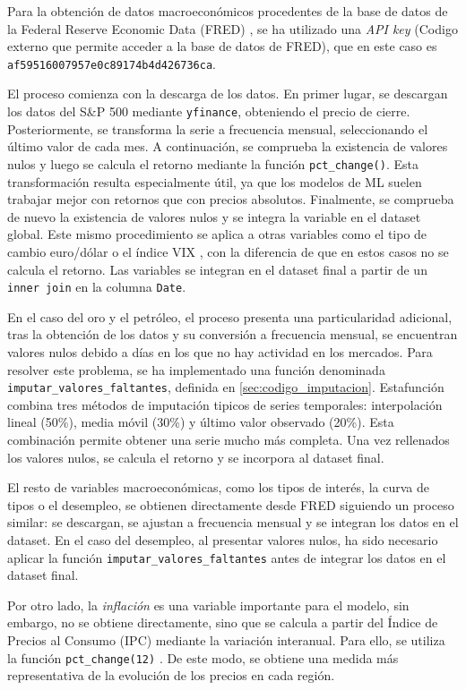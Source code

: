 Para la obtención de datos macroeconómicos procedentes de la base de datos de la Federal Reserve Economic Data (FRED) \cite{fred}, se ha utilizado una \emph{API key} (Codigo externo que permite acceder a la base de datos de FRED), que en este caso es \texttt{af59516007957e0c89174b4d426736ca}.

El proceso comienza con la descarga de los datos. En primer lugar, se descargan los datos del S\&P 500 \cite{sp500} mediante \texttt{yfinance}, obteniendo el precio de cierre. Posteriormente, se transforma la serie a frecuencia mensual, seleccionando el último valor de cada mes. A continuación, se comprueba la existencia de valores nulos y luego se calcula el retorno mediante la función \texttt{pct\_change()}. Esta transformación resulta especialmente útil, ya que los modelos de ML suelen trabajar mejor con retornos que con precios absolutos. Finalmente, se comprueba de nuevo la existencia de valores nulos y se integra la variable en el dataset global. Este mismo procedimiento se aplica a otras variables como el tipo de cambio euro/dólar o el índice VIX \cite{vix}, con la diferencia de que en estos casos no se calcula el retorno. Las variables se integran en el dataset final a partir de un \texttt{inner join} en la columna \texttt{Date}.

En el caso del oro y el petróleo, el proceso presenta una particularidad adicional, tras la obtención de los datos y su conversión a frecuencia mensual, se encuentran valores nulos debido a días en los que no hay actividad en los mercados. Para resolver este problema, se ha implementado una función denominada \texttt{imputar\_valores\_faltantes}, definida en \ref{sec:codigo_imputacion}. Estafunción combina tres métodos de imputación \cite{inputacion_valores} tipicos de series temporales: interpolación lineal (50\%), media móvil (30\%) y último valor observado (20\%). Esta combinación permite obtener una serie mucho más completa. Una vez rellenados los valores nulos, se calcula el retorno y se incorpora al dataset final.

El resto de variables macroeconómicas, como los tipos de interés, la curva de tipos o el desempleo, se obtienen directamente desde FRED siguiendo un proceso similar: se descargan, se ajustan a frecuencia mensual y se integran los datos en el dataset. En el caso del desempleo, al presentar valores nulos, ha sido necesario aplicar la función \texttt{imputar\_valores\_faltantes} antes de integrar los datos en el dataset final.

Por otro lado, la \emph{inflación} es una variable importante para el modelo, sin embargo, no se obtiene directamente, sino que se calcula a partir del Índice de Precios al Consumo (IPC) \cite{ipc} mediante la variación interanual. Para ello, se utiliza la función \texttt{pct\_change(12)} \cite{pandas}. De este modo, se obtiene una medida más representativa de la evolución de los precios en cada región.

